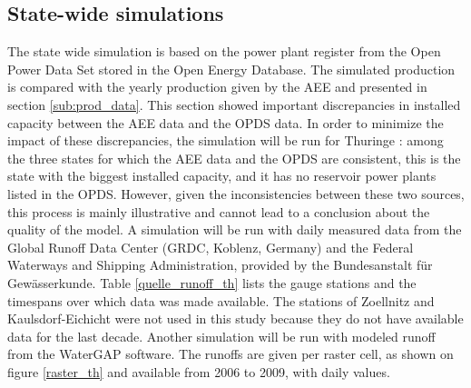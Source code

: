 \subsection{State-wide simulations} 
\label{sub:metho_sw}
The state wide simulation is based on the power plant register from the Open Power Data Set stored in the Open Energy Database. The simulated production is compared with the yearly production given by the AEE and presented in section \ref{sub:prod_data}. This section showed important discrepancies in installed capacity between the AEE data and the OPDS data. In order to minimize the impact of these discrepancies, the simulation will be run for Thuringe : among the three states for which the AEE data and the OPDS are consistent, this is the state with the biggest installed capacity, and it has no reservoir power plants listed in the OPDS. However, given the inconsistencies between these two sources, this process is mainly illustrative and cannot lead to a conclusion about the quality of the model. \newline
A simulation will be run with daily measured data from the Global Runoff Data Center (GRDC, Koblenz, Germany) and the Federal Waterways and Shipping Administration, provided by the Bundesanstalt für Gewässerkunde. Table \ref{quelle_runoff_th} lists the gauge stations and the timespans over which data was made available. The stations of Zoellnitz and Kaulsdorf-Eichicht were not used in this study because they do not have available data for the last decade. Another simulation will be run with modeled runoff from the WaterGAP software. The runoffs are given per raster cell, as shown on figure \ref{raster_th} and available from 2006 to 2009, with daily values.
